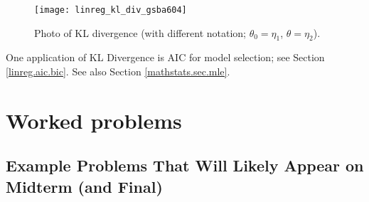 \begin{figure}[htbp]
\begin{center}
\texttt{[image: linreg\_kl\_div\_gsba604]}
\caption{Photo of KL divergence (with different notation; \(\theta_0 = \eta_1\), \(\theta = \eta_2\)).}
\label{linreg.kl.div.gsba604}
\end{center}
\end{figure}


One application of KL Divergence is AIC for model selection; see Section \ref{linreg.aic.bic}. See also Section \ref{mathstats.sec.mle}.

%
%
%
%
%
%
%
\section{Worked problems}

\subsection{Example Problems That Will Likely Appear on Midterm (and Final)}

%
%
%
%
%
%
%
%


